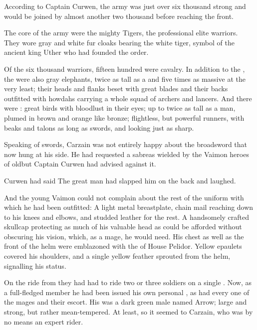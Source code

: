 According to Captain Curwen, the army was just over six thousand strong and would be joined by almost another two thousand before reaching the front. 

The core of the army were the mighty Tigers, the professional elite warriors. They wore gray and white fur cloaks bearing the white tiger, symbol of the ancient king Uther who had founded the order. 

Of the six thousand warriors, fifteen hundred were cavalry. 
In addition to the \relcs, the were also gray elephants, twice as tall as a \relc{} and five times as massive at the very least; their heads and flanks beset with great blades and their backs outfitted with howdahs carrying a whole squad of archers and lancers. 
And there were \grulcans: great birds with bloodlust in their eyes; up to twice as tall as a man, plumed in brown and orange like bronze; flightless, but powerful runners, with beaks and talons as long as swords, and looking just as sharp. 

Speaking of swords, Carzain was not entirely happy about the broadsword that now hung at his side. He had requested a sabre\dash as wielded by the Vaimon heroes of old\dash but Captain Curwen had advised against it. 

 Curwen had said  The great man had slapped him on the back and laughed.  


And the young Vaimon could not complain about the rest of the \ishrah{} uniform with which he had been outfitted: 
A light metal breastplate, chain mail reaching down to his knees and elbows, and studded leather for the rest. 
A handsomely crafted skullcap protecting as much of his valuable head as could be afforded without obscuring his vision, which, as a mage, he would need. 
His chest as well as the front of the helm were emblazoned with the \grulcan{} of House Pelidor. Yellow epaulets covered his shoulders, and a single yellow feather sprouted from the helm, signalling his \ishrah{} status. 

On the ride from \Redglen{} they had had to ride two or three soldiers on a single \relc. 
Now, as a full-fledged \ishrah{} member he had been issued his own personal \relc, as had every one of the mages and their escort. 
His was a dark green male named Arrow; large and strong, but rather mean-tempered. 
At least, so it seemed to Carzain, who was by no means an expert rider. 

